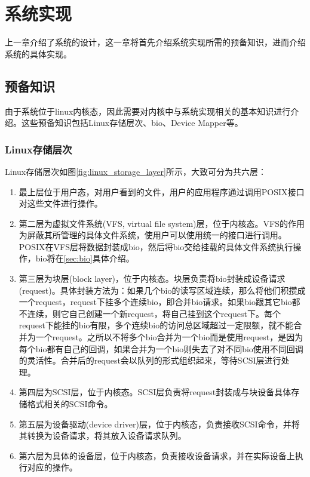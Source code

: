 
\chapter{系统实现}
\label{chap:sys_implement}

上一章介绍了系统的设计，这一章将首先介绍系统实现所需的预备知识，进而介绍系统的具体实现。

\section{预备知识}

由于系统位于linux内核态，因此需要对内核中与系统实现相关的基本知识进行介绍。这些预备知识包括Linux存储层次、bio、Device Mapper等。

\subsection{Linux存储层次}

Linux存储层次如图\ref{fig:linux_storage_layer}所示，大致可分为共六层\cite{敖青云2011存储技术原理分析}：

\begin{enumerate}
    \item 最上层位于用户态，对用户看到的文件，用户的应用程序通过调用POSIX接口对这些文件进行操作。

    \item 第二层为虚拟文件系统(VFS, virtual file system)层，位于内核态。VFS的作用为屏蔽其所管理的具体文件系统，使用户可以使用统一的接口进行调用。POSIX在VFS层将数据封装成bio，然后将bio交给挂载的具体文件系统执行操作，bio将在\ref{sec:bio}具体介绍。

    \item 第三层为块层(block layer)，位于内核态。块层负责将bio封装成设备请求(request)。具体封装方法为：如果几个bio的读写区域连续，那么将他们积攒成一个request，request下挂多个连续bio，即合并bio请求。如果bio跟其它bio都不连续，则它自己创建一个新request，将自己挂到这个request下。每个request下能挂的bio有限，多个连续bio的访问总区域超过一定限额，就不能合并为一个request。之所以不将多个bio合并为一个bio而是使用request，是因为每个bio都有自己的回调，如果合并为一个bio则失去了对不同bio使用不同回调的灵活性。合并后的request会以队列的形式组织起来，等待SCSI层进行处理。

    \item 第四层为SCSI层，位于内核态。SCSI层负责将request封装成与块设备具体存储格式相关的SCSI命令。

    \item 第五层为设备驱动(device driver)层，位于内核态，负责接收SCSI命令，并将其转换为设备请求，将其放入设备请求队列。

    \item 第六层为具体的设备层，位于内核态，负责接收设备请求，并在实际设备上执行对应的操作。

\end{enumerate}

